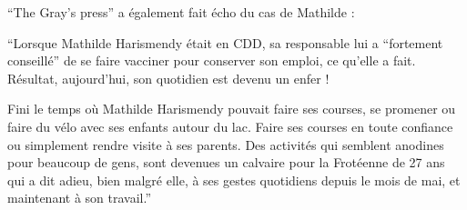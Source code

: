 {“The Gray's press” a également fait écho du cas de Mathilde :

“Lorsque Mathilde Harismendy était en CDD, sa responsable lui a “fortement
conseillé” de se faire vacciner pour conserver son emploi, ce qu'elle a
fait. Résultat, aujourd'hui, son quotidien est devenu un enfer !

Fini le temps où Mathilde Harismendy pouvait faire ses courses, se promener ou
faire du vélo avec ses enfants autour du lac. Faire ses courses en toute
confiance ou simplement rendre visite à ses parents. Des activités qui semblent
anodines pour beaucoup de gens, sont devenues un calvaire pour la Frotéenne de
27 ans qui a dit adieu, bien malgré elle, à ses gestes quotidiens depuis le mois
de mai, et maintenant à son travail.”

}
